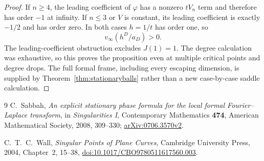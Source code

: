 \documentclass[11pt]{article}
\theoremstyle{definition}\newtheorem{definition}[theorem]{Definition}
\theoremstyle{remark}\newtheorem{remark}[theorem]{Remark}
\begin{document}
\begin{proof}
If $n\geq4$, the leading coefficient of $\varphi$ has a nonzero
$tV_n$ term and therefore has order $-1$ at infinity. If $n\leq3$
or $V$ is constant, its leading coefficient is exactly $-1/2$ and
has order zero. In both cases $h=1/t$ has order one, so
\[
 v_\infty(h^D/a_D)>0.
\]
The leading-coefficient obstruction excludes $J(1)=1$. The degree
calculation was exhaustive, so this proves the proposition even at
multiple critical points and degree drops. The full formal frame,
including every escaping dimension, is supplied by
Theorem~\ref{thm:stationaryballs} rather than a new case-by-case
saddle calculation.
\end{proof}

\begin{thebibliography}{9}
C.~Sabbah, \emph{An explicit stationary phase formula for the local
formal Fourier--Laplace transform}, in \emph{Singularities I},
Contemporary Mathematics \textbf{474}, American Mathematical Society,
2008, 309--330;
\href{https://arxiv.org/abs/0706.3570v2}{arXiv:0706.3570v2}.

C.~T.~C.~Wall, \emph{Singular Points of Plane Curves}, Cambridge
University Press, 2004, Chapter~2, 15--38,
\href{https://doi.org/10.1017/CBO9780511617560.003}{doi:10.1017/CBO9780511617560.003}.

\end{thebibliography}
\end{document}
